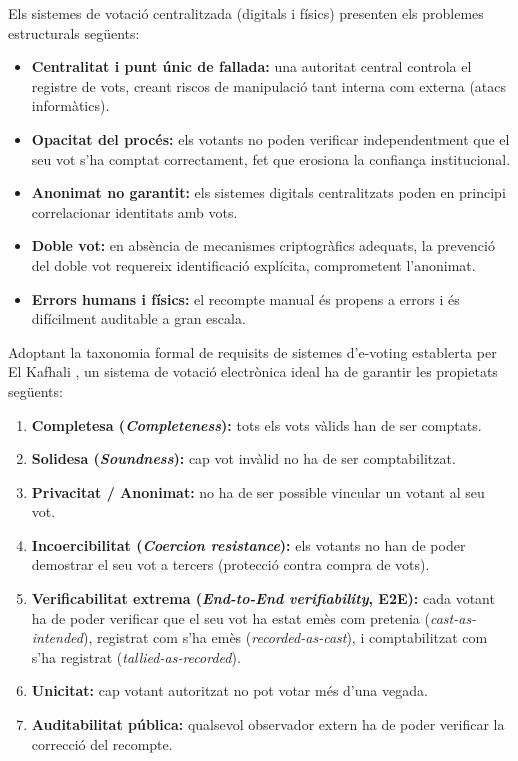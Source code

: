 \documentclass[12pt,a4paper,catalan]{article}
\begin{document}
Els sistemes de votació centralitzada (digitals i físics) presenten els problemes estructurals següents:

\begin{itemize}
    \item \textbf{Centralitat i punt únic de fallada:} una autoritat central controla el registre de vots, creant riscos de manipulació tant interna com externa (atacs informàtics).
    \item \textbf{Opacitat del procés:} els votants no poden verificar independentment que el seu vot s'ha comptat correctament, fet que erosiona la confiança institucional.
    \item \textbf{Anonimat no garantit:} els sistemes digitals centralitzats poden en principi correlacionar identitats amb vots.
    \item \textbf{Doble vot:} en absència de mecanismes criptogràfics adequats, la prevenció del doble vot requereix identificació explícita, comprometent l'anonimat.
    \item \textbf{Errors humans i físics:} el recompte manual és propens a errors i és difícilment auditable a gran escala.
\end{itemize}

Adoptant la taxonomia formal de requisits de sistemes d'e-voting establerta per El Kafhali \cite{elkafhali2024}, un sistema de votació electrònica ideal ha de garantir les propietats següents:

\begin{enumerate}
    \item \textbf{Completesa (\textit{Completeness}):} tots els vots vàlids han de ser comptats.
    \item \textbf{Solidesa (\textit{Soundness}):} cap vot invàlid no ha de ser comptabilitzat.
    \item \textbf{Privacitat / Anonimat:} no ha de ser possible vincular un votant al seu vot.
    \item \textbf{Incoercibilitat (\textit{Coercion resistance}):} els votants no han de poder demostrar el seu vot a tercers (protecció contra compra de vots).
    \item \textbf{Verificabilitat extrema (\textit{End-to-End verifiability}, E2E):} cada votant ha de poder verificar que el seu vot ha estat emès com pretenia (\textit{cast-as-intended}), registrat com s'ha emès (\textit{recorded-as-cast}), i comptabilitzat com s'ha registrat (\textit{tallied-as-recorded}).
    \item \textbf{Unicitat:} cap votant autoritzat no pot votar més d'una vegada.
    \item \textbf{Auditabilitat pública:} qualsevol observador extern ha de poder verificar la correcció del recompte.
\end{enumerate}
\end{document}
